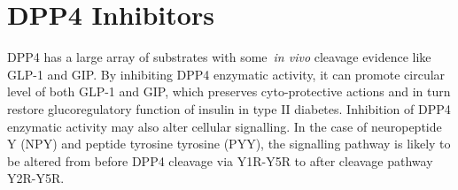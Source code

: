 \section{DPP4 Inhibitors}
DPP4 has a large array of substrates with some~\textit{in vivo} cleavage evidence like GLP-1 and GIP. By inhibiting DPP4 enzymatic activity, it can promote circular level of both GLP-1 and GIP, which preserves cyto-protective actions and in turn restore glucoregulatory function of insulin in type II diabetes. Inhibition of DPP4 enzymatic activity may also alter cellular signalling. In the case of neuropeptide Y (NPY) and peptide tyrosine tyrosine (PYY), the signalling pathway is likely to be altered from before DPP4 cleavage via Y1R-Y5R to after cleavage pathway Y2R-Y5R.~\cite{Mulvihill_2014} 